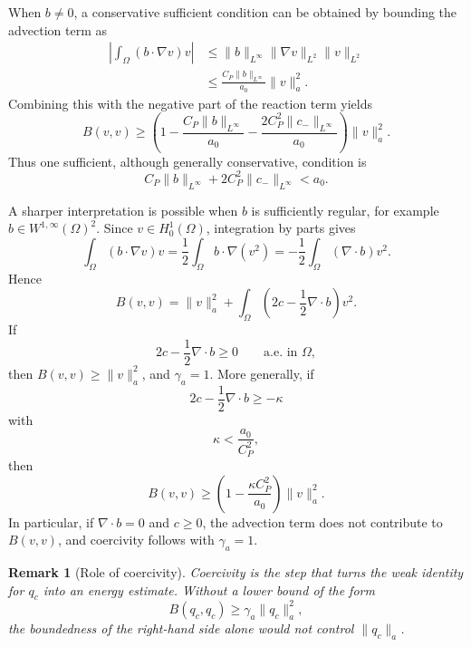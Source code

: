 \documentclass[11pt]{article}
\newtheorem{remark}{Remark}
\begin{document}
When \(b\neq0\), a conservative sufficient condition can be obtained by
bounding the advection term as
\begin{align*}
    \left|
    \int_\Omega (b\cdot\nabla v)v
    \right|
    &\le
    \|b\|_{L^\infty}
    \|\nabla v\|_{L^2}
    \|v\|_{L^2}
    \\
    &\le
    \frac{C_P\|b\|_{L^\infty}}{a_0}
    \|v\|_a^2.
\end{align*}
Combining this with the negative part of the reaction term yields
\[
    B(v,v)
    \ge
    \left(
    1
    -
    \frac{C_P\|b\|_{L^\infty}}{a_0}
    -
    \frac{2C_P^2\|c_-\|_{L^\infty}}{a_0}
    \right)
    \|v\|_a^2.
\]
Thus one sufficient, although generally conservative, condition is
\begin{equation}
    C_P\|b\|_{L^\infty}
    +
    2C_P^2\|c_-\|_{L^\infty}
    <
    a_0.
    \label{eq:conservative-coercivity-condition}
\end{equation}

A sharper interpretation is possible when \(b\) is sufficiently regular,
for example \(b\in W^{1,\infty}(\Omega)^2\).  Since \(v\in H_0^1(\Omega)\),
integration by parts gives
\begin{equation}
    \int_\Omega (b\cdot\nabla v)v
    =
    \frac12\int_\Omega b\cdot\nabla(v^2)
    =
    -\frac12\int_\Omega (\nabla\cdot b)v^2.
    \label{eq:advection-integration-by-parts}
\end{equation}
Hence
\begin{equation}
    B(v,v)
    =
    \|v\|_a^2
    +
    \int_\Omega
    \left(
    2c-\frac12\nabla\cdot b
    \right)v^2.
    \label{eq:Bvv-effective-reaction}
\end{equation}
If
\[
    2c-\frac12\nabla\cdot b\ge0
    \qquad
    \text{a.e. in }\Omega,
\]
then \(B(v,v)\ge \|v\|_a^2\), and \(\gamma_a=1\).  More generally, if
\[
    2c-\frac12\nabla\cdot b\ge -\kappa
\]
with
\[
    \kappa < \frac{a_0}{C_P^2},
\]
then
\[
    B(v,v)
    \ge
    \left(
    1-\frac{\kappa C_P^2}{a_0}
    \right)
    \|v\|_a^2.
\]
In particular, if \(\nabla\cdot b=0\) and \(c\ge0\), the advection term
does not contribute to \(B(v,v)\), and coercivity follows with
\(\gamma_a=1\).

\begin{remark}[Role of coercivity]
Coercivity is the step that turns the weak identity for \(q_c\) into an
energy estimate.  Without a lower bound of the form
\[
    B(q_c,q_c)\ge \gamma_a\|q_c\|_a^2,
\]
the boundedness of the right-hand side alone would not control
\(\|q_c\|_a\).
\end{remark}
\end{document}
